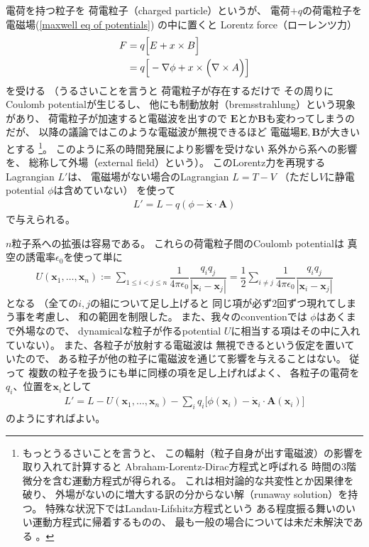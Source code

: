 電荷を持つ粒子を
荷電粒子（charged particle）というが、
電荷$+q$の荷電粒子を
電磁場(\ref{maxwell eq of potentials})
の中に置くと
Lorentz force（ローレンツ力）
\begin{align}
  F
  &=
  q
  \Big[
    E
  +
   x
    \times
    B
  \Big]
\notag\\&=
  q
  \Big[
    - \nabla\phi
  +
   x
    \times
    \Big(
      \nabla \times A
    \Big)
  \Big]
\end{align}
を受ける
（うるさいことを言うと
荷電粒子が存在するだけで
その周りにCoulomb potentialが生じるし、
他にも制動放射（bremsstrahlung）という現象があり、
荷電粒子が加速すると電磁波を出すので
$\bm{E}$とか$\bm{B}$も変わってしまうのだが、
以降の議論ではこのような電磁波が無視できるほど
電磁場$\bm{E}, \bm{B}$が大きいとする
\footnote{
  もっとうるさいことを言うと、
  この輻射（粒子自身が出す電磁波）の影響を取り入れて計算すると
  Abraham-Lorentz-Dirac方程式と呼ばれる
  時間の3階微分を含む運動方程式が得られる。
  これは相対論的な共変性とか因果律を破り、
  外場がないのに増大する訳の分からない解（runaway solution）を持つ。
  特殊な状況下ではLandau-Lifshitz方程式という
  ある程度振る舞いのいい運動方程式に帰着するものの、
  最も一般の場合については未だ未解決である
  \cite{Abraham-Lorentz}。
  }。
このように系の時間発展により影響を受けない
系外から系への影響を、
総称して外場（external field）という）。
このLorentz力を再現するLagrangian $L'$は、
電磁場がない場合のLagrangian $L = T - V$
（ただし$V$に静電potential $\phi$は含めていない）
を使って
\begin{align}
  L' = L - q(\phi - \dot{\bm{x}} \cdot \bm{A})
\label{point particle lagrangian with ele-mag potential}
\end{align}
で与えられる。

$n$粒子系への拡張は容易である。
これらの荷電粒子間のCoulomb potentialは
真空の誘電率$\epsilon_0$を使って単に
\begin{align}
  U(\bm{x}_1, \dots, \bm{x}_n)
  :=
  \sum_{1 \le i < j \le n}
  \dfrac{1}{4 \pi \epsilon_0}
  \dfrac{q_i q_j}{|\bm{x}_i - \bm{x}_j|}
  =
  \dfrac{1}{2}
  \sum_{i \neq j}
  \dfrac{1}{4 \pi \epsilon_0}
  \dfrac{q_i q_j}{|\bm{x}_i - \bm{x}_j|}
\end{align}
となる
（全ての$i, j$の組について足し上げると
同じ項が必ず$2$回ずつ現れてしまう事を考慮し、
和の範囲を制限した。
また、我々のconventionでは
$\phi$はあくまで外場なので、
dynamicalな粒子が作るpotential
$U$に相当する項はその中に入れていない）。
また、各粒子が放射する電磁波は
無視できるという仮定を置いていたので、
ある粒子が他の粒子に電磁波を通じて影響を与えることはない。
従って
複数の粒子を扱うにも単に同様の項を足し上げればよく、
各粒子の電荷を$q_i$、位置を$\bm{x}_i$として
\begin{align}
  L' = L
  -
  U(\bm{x}_1, \dots, \bm{x}_n)
  -
  \sum_i
  q_i\Big[
    \phi(\bm{x}_i)
  -
    \dot{\bm{x}}_i \cdot \bm{A}(\bm{x}_i)
  \Big]
\label{many point particle lagrangian with ele-mag potential}
\end{align}
のようにすればよい。

